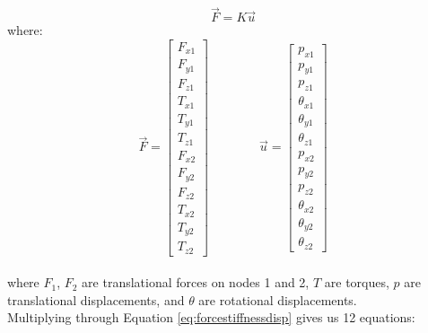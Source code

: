 { \begin{equation} \label{eq:forcestiffnessdisp} \vec{F} = K\vec{u} \end{equation}
where:
\[ \vec{F} =  \left[ \begin{array}{ccc}
F_{x1}\\
F_{y1}\\
F_{z1}\\
T_{x1}\\
T_{y1}\\
T_{z1}\\
F_{x2}\\
F_{y2}\\
F_{z2}\\
T_{x2}\\
T_{y2}\\
T_{z2}
 \end{array} \right]  \qquad \qquad  
 \vec{u} =  \left[ \begin{array}{ccc}
p_{x1}\\
p_{y1}\\
p_{z1}\\
\theta_{x1}\\
\theta_{y1}\\
\theta_{z1}\\
p_{x2}\\
p_{y2}\\
p_{z2}\\
\theta_{x2}\\
\theta_{y2}\\
\theta_{z2}
 \end{array} \right]
 \]\\
 
where $F_1$, $F_2$ are translational forces on nodes 1 and 2, $T$ are torques, $p$ are translational displacements, and $\theta$ are rotational displacements.\\

Multiplying through Equation \ref{eq:forcestiffnessdisp} gives us 12 equations:

}
